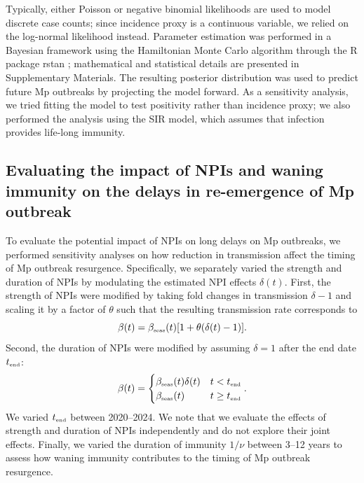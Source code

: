 \documentclass[12pt]{article}
\newcommand{\tsub}[2]{#1_{{\textrm{\tiny #2}}}}
\begin{document}
Typically, either Poisson or negative binomial likelihoods are used to model discrete case counts;
since incidence proxy is a continuous variable, we relied on the log-normal likelihood instead.
Parameter estimation was performed in a Bayesian framework using the Hamiltonian Monte Carlo algorithm through the R package rstan \citep{carpenter2017stan,rstan};
mathematical and statistical details are presented in Supplementary Materials.
The resulting posterior distribution was used to predict future Mp outbreaks by projecting the model forward.
As a sensitivity analysis, we tried fitting the model to test positivity rather than incidence proxy;
we also performed the analysis using the SIR model, which assumes that infection provides life-long immunity.

\subsection{Evaluating the impact of NPIs and waning immunity on the delays in re-emergence of Mp outbreak}

To evaluate the potential impact of NPIs on long delays on Mp outbreaks, we performed sensitivity analyses on how reduction in transmission affect the timing of Mp outbreak resurgence.
Specifically, we separately varied the strength and duration of NPIs by modulating the estimated NPI effects $\delta(t)$.
First, the strength of NPIs were modified by taking fold changes in transmission $\delta-1$ and scaling it by a factor of $\theta$ such that the resulting transmission rate corresponds to
\begin{equation}
\beta(t) = \tsub{\beta}{seas}(t) [1+\theta (\delta(t)-1)].
\end{equation}
Second, the duration of NPIs were modified by assuming $\delta = 1$ after the end date $\tsub{t}{end}$:
\begin{equation}
\beta(t) = \begin{cases}
\tsub{\beta}{seas}(t) \delta(t) & t <  \tsub{t}{end}\\
\tsub{\beta}{seas}(t) & t \geq \tsub{t}{end}
\end{cases}.
\end{equation}
We varied $\tsub{t}{end}$ between 2020--2024.
We note that we evaluate the effects of strength and duration of NPIs independently and do not explore their joint effects.
Finally, we varied the duration of immunity $1/\nu$ between 3--12 years to assess how waning immunity contributes to the timing of Mp outbreak resurgence.
\end{document}
